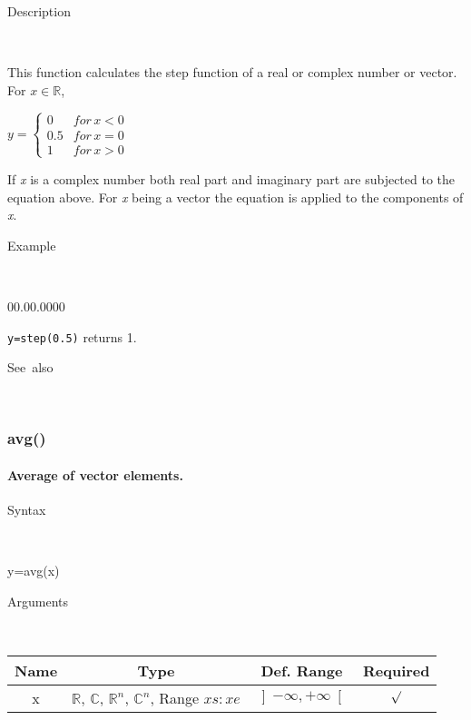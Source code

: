 \begin{description}
\item [Description]~
\end{description}
This function calculates the step function of a real or complex number
or vector. For $x\in\mathbb{R}$,

\medskip{}
$y=\left\{ \begin{array}{cc}
0 & for\, x<0\\
0.5 & for\, x=0\\
1 & for\, x>0\end{array}\right.$
\medskip{}

\noindent If \textit{x} is a complex number both real part and imaginary
part are subjected to the equation above. For \textit{x} being a vector
the equation is applied to the components of \textit{x}.

\begin{description}
\item [Example]~
\end{description}
\begin{lyxlist}{00.00.0000}
\item [\texttt{y=step(0.5)}]returns 1.
\end{lyxlist}
\begin{description}
\item [See~also]~
\end{description}

\newpage
{}




\subsubsection*{\hypertarget{avg}{}{\Large avg()}}


\paragraph{\label{par:Average}Average of vector elements.}

\begin{description}
\item [Syntax]~
\end{description}
y=avg(x)

\begin{description}
\item [Arguments]~
\end{description}
\begin{tabular}{|c|c|c|c|}
\hline 
Name&
Type&
Def. Range&
Required\tabularnewline
\hline
\hline 
x&
$\mathbb{R}$, $\mathbb{C}$, $\mathbb{R}^{n}$, $\mathbb{C}^{n}$,
Range $xs:xe$&
$\left]-\infty,+\infty\right[$&
$\surd$\tabularnewline
\hline
\end{tabular}

